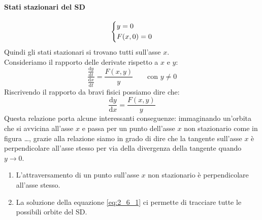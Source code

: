 \paragraph{Stati stazionari del SD}%
\[\begin{dcases}
    y=0\\
    F(x,0)=0
\end{dcases}\] 
Quindi gli stati stazionari si trovano tutti sull'asse $x$.\\
Consideriamo il rapporto delle derivate rispetto a $x$ e $y$:
\[
    \frac{\frac{\text{d} y}{\text{d} t}}{\frac{\text{d} x}{\text{d} t} } = \frac{F(x,y)}{y} \qquad   \text{con } y\neq 0
\] 
Riscrivendo il rapporto da bravi fisici possiamo dire che:
\begin{equation}
    \frac{\text{d} y}{\text{d} x} = \frac{F(x, y)}{y}
    \label{eq:2_6_1}
\end{equation}
Questa relazione porta alcune interessanti conseguenze: immaginando un'orbita che si avvicina all'asse $x$ e passa per un punto dell'asse $x$ non stazionario come in figura \ldots, grazie alla relazione siamo in grado di dire che la tangente sull'asse $x$ è perpendicolare all'asse stesso per via della divergenza della tangente quando $y\to 0$.
\begin{enumerate}
    \item L'attraversamento di un punto sull'asse $x$ non stazionario è perpendicolare all'asse stesso.
    \item La soluzione della equazione \ref{eq:2_6_1} ci permette di tracciare tutte le possibili orbite del SD.
\end{enumerate}
